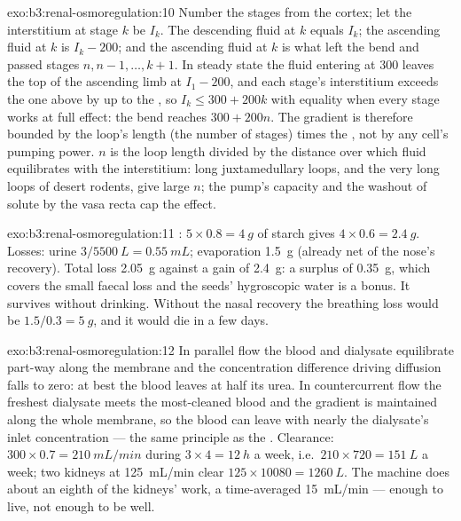 \begin{solution}{exo:b3:renal-osmoregulation:10}
Number the stages from the cortex; let the interstitium at stage $k$
be $I_{k}$. The descending fluid at $k$ equals $I_{k}$; the ascending
fluid at $k$ is $I_{k} - 200$; and the ascending fluid at $k$ is what
left the bend and passed stages $n, n-1, \dots, k+1$. In steady state
the fluid entering at \qty{300}{} leaves the top of the ascending limb
at $I_{1} - 200$, and each stage's interstitium exceeds the one above
by up to the , so $I_{k} \le 300 + 200k$ with equality when
every stage works at full effect: the bend reaches $300 + 200n$. The
gradient is therefore bounded by the loop's length (the number of
stages) times the , not by any cell's pumping power. $n$
is the loop length divided by the distance over which fluid
equilibrates with the interstitium: long juxtamedullary loops, and the
very long loops of desert rodents, give large $n$; the pump's capacity
and the washout of solute by the vasa recta cap the effect.
\end{solution}

\begin{solution}{exo:b3:renal-osmoregulation:11}
: $5\times 0.8 = \qty{4}{g}$ of starch gives $4\times 0.6
= \qty{2.4}{g}$. Losses: urine $3/5500\ \unit{L} = \qty{0.55}{mL}$;
evaporation \qty{1.5}{g} (already net of the nose's recovery). Total
loss \qty{2.05}{g} against a gain of \qty{2.4}{g}: a surplus of
\qty{0.35}{g}, which covers the small faecal loss and the seeds'
hygroscopic water is a bonus. It survives without drinking. Without
the nasal recovery the breathing loss would be $1.5/0.3 = \qty{5}{g}$,
and it would die in a few days.
\end{solution}

\begin{solution}{exo:b3:renal-osmoregulation:12}
In parallel flow the blood and dialysate equilibrate part-way along
the membrane and the concentration difference driving diffusion falls
to zero: at best the blood leaves at half its urea. In countercurrent
flow the freshest dialysate meets the most-cleaned blood and the
gradient is maintained along the whole membrane, so the blood can
leave with nearly the dialysate's inlet concentration --- the same
principle as the . Clearance: $300\times 0.7 =
\qty{210}{mL/min}$ during $3\times 4 = \qty{12}{h}$ a week, i.e.\
$210\times 720 = \qty{151}{L}$ a week; two kidneys at
\qty{125}{mL/min} clear $125\times\num{10080} = \qty{1260}{L}$. The
machine does about an eighth of the kidneys' work, a time-averaged
\qty{15}{mL/min} --- enough to live, not enough to be well.
\end{solution}

